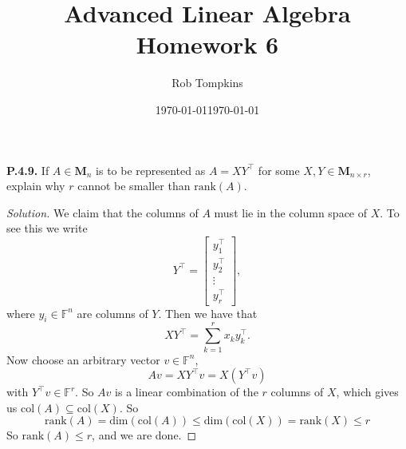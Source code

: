\documentclass[12pt]{amsart}
\title{Advanced Linear Algebra\\Homework 6}
\author{Rob Tompkins}
\date{\today}
\newenvironment{solution}
{\begin{proof}[Solution]}
{\end{proof}}
\begin{document}
    \maketitle
    \date{\today}
    \begin{onehalfspace}

        \noindent\textbf{P.4.9.} If $A\in\mathbf{M}_n$ is to be represented as $A=XY^\top$ for some
        $X,Y\in\mathbf{M}_{n\times r}$, explain why $r$ cannot be smaller than $\text{rank}(A)$.
        \begin{solution}
            We claim that the columns of $A$ must lie in the column space of $X$.
            To see this we write
            \begin{displaymath}
                Y^{\top} = \left[\begin{matrix}
                                     y_1^{\top}\\
                                     y_2^{\top}\\
                                     \vdots\\
                                     y_r^{\top}
                \end{matrix}\right],
            \end{displaymath}
            where $y_i\in\mathbb{F}^n$ are columns of $Y$. Then we have that
            \begin{displaymath}
                XY^{\top} = \sum_{k=1}^r x_k y_k^{\top}.
            \end{displaymath}
            Now choose an arbitrary vector $v\in\mathbb{F}^n$,
            \begin{displaymath}
                Av = XY^{\top}v = X(Y^\top v)
            \end{displaymath}
            with $Y^\top v\in\mathbb{F}^r$.
            So $Av$ is a linear combination of the $r$ columns of $X$, which gives us
            $\text{col}(A)\subseteq\text{col}(X)$.
            So
            \begin{displaymath}
                \text{rank}(A) = \text{dim}(\text{col}(A)) \le \text{dim}(\text{col}(X)) = \text{rank}(X)\le r
            \end{displaymath}
            So $\text{rank}(A)\le r$, and we are done.
        \end{solution}


\end{onehalfspace}
\end{document}
